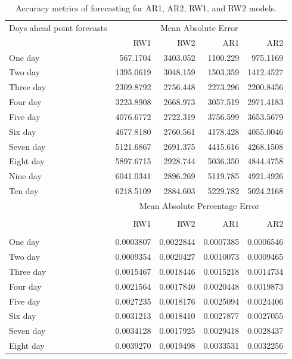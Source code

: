 \documentclass[10pt,letterpaper]{article}
\begin{document}
\begin{table}[!h]
	
	\caption{\label{tab:Accuracy}Accuracy metrics of forecasting for AR1, AR2, RW1, and RW2 models.}
	\centering
	\begin{tabular}[t]{lrrrr}
		\hline
		Days ahead point forecasts & \multicolumn{4}{c}{Mean Absolute Error}\\
		\cline{2-5}
		& RW1 & RW2 & AR1 & AR2\\
		\hline
	One day & 567.1704 & 3403.052 & 1100.229 & 975.1169\\
	\hline
	Two day & 1395.0619 & 3048.159 & 1503.359 & 1412.4527\\
	\hline
	Three day & 2309.8792 & 2756.448 & 2273.296 & 2200.8456\\
	\hline
	Four day & 3223.8908 & 2668.973 & 3057.519 & 2971.4183\\
	\hline
	Five day & 4076.6772 & 2722.319 & 3756.599 & 3653.5679\\
	\hline
	Six day & 4677.8180 & 2760.561 & 4178.428 & 4055.0046\\
	\hline
	Seven day & 5121.6867 & 2691.375 & 4415.616 & 4268.1508\\
	\hline
	Eight day & 5897.6715 & 2928.744 & 5036.350 & 4844.4758\\
	\hline
	Nine day & 6041.0341 & 2896.269 & 5119.785 & 4921.4926\\
	\hline
	Ten day & 6218.5109 & 2884.603 & 5229.782 & 5024.2168\\
	\hline
		& \multicolumn{4}{c}{Mean Absolute Percentage Error}\\
		\cline{2-5}\\
		& RW1 & RW2 & AR1 & AR2\\
		\hline\\
	One day & 0.0003807 & 0.0022844 & 0.0007385 & 0.0006546\\
	\hline
	Two day & 0.0009354 & 0.0020427 & 0.0010073 & 0.0009465\\
	\hline
	Three day & 0.0015467 & 0.0018446 & 0.0015218 & 0.0014734\\
	\hline
	Four day & 0.0021564 & 0.0017840 & 0.0020448 & 0.0019873\\
	\hline
	Five day & 0.0027235 & 0.0018176 & 0.0025094 & 0.0024406\\
	\hline
	Six day & 0.0031213 & 0.0018410 & 0.0027877 & 0.0027055\\
	\hline
	Seven day & 0.0034128 & 0.0017925 & 0.0029418 & 0.0028437\\
	\hline
	Eight day & 0.0039270 & 0.0019498 & 0.0033531 & 0.0032256\\

\end{tabular}
\end{table}
\end{document}
